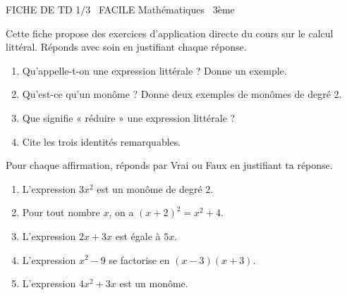 \documentclass[11pt]{article}
\begin{document}
\begin{tcolorbox}[enhanced,colback=popink,colframe=popink,arc=10pt,boxrule=0pt,left=12pt,right=12pt,top=9pt,bottom=9pt]
{\color{white}\popxbold\small FICHE DE TD 1/3 \textbullet\ FACILE \hfill Mathématiques \textbullet\ 3ème\par}
\end{tcolorbox}
\vspace{4pt}
Cette fiche propose des exercices d'application directe du cours sur le calcul littéral. Réponds avec soin en justifiant chaque réponse.

\begin{exercice}
\begin{enumerate}
\item Qu'appelle-t-on une expression littérale ? Donne un exemple.
\item Qu'est-ce qu'un monôme ? Donne deux exemples de monômes de degré $2$.
\item Que signifie « réduire » une expression littérale ?
\item Cite les trois identités remarquables.
\end{enumerate}
\end{exercice}

\begin{exercice}
Pour chaque affirmation, réponds par Vrai ou Faux en justifiant ta réponse.
\begin{enumerate}
\item L'expression $3x^2$ est un monôme de degré $2$.
\item Pour tout nombre $x$, on a $(x+2)^2 = x^2 + 4$.
\item L'expression $2x + 3x$ est égale à $5x$.
\item L'expression $x^2 - 9$ se factorise en $(x-3)(x+3)$.
\item L'expression $4x^2 + 3x$ est un monôme.
\end{enumerate}
\end{exercice}
\end{document}
